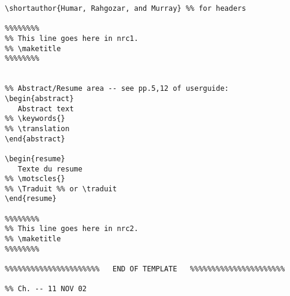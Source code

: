 \begin{verbatim}
\shortauthor{Humar, Rahgozar, and Murray} %% for headers

%%%%%%%%
%% This line goes here in nrc1.
%% \maketitle			
%%%%%%%%


%% Abstract/Resume area -- see pp.5,12 of userguide:
\begin{abstract}
   Abstract text
%% \keywords{}
%% \translation 
\end{abstract}

\begin{resume}
   Texte du resume
%% \motscles{}
%% \Traduit %% or \traduit
\end{resume}

%%%%%%%%
%% This line goes here in nrc2.
%% \maketitle			
%%%%%%%%

%%%%%%%%%%%%%%%%%%%%%%   END OF TEMPLATE   %%%%%%%%%%%%%%%%%%%%%%

%% Ch. -- 11 NOV 02

\end{verbatim}




